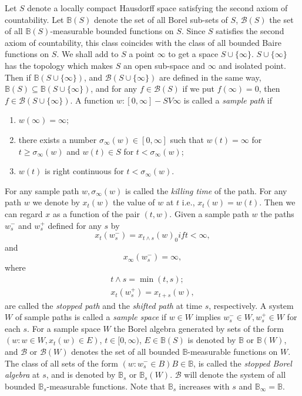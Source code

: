 Let $S$ denote a locally compact Hausdorff space satisfying the second
axiom of countability. Let $\mathbb{B}(S)$ denote the set of all Borel
sub-sets of $S$, $\mathscr{B}(S)$ the set of all
$\mathbb{B}(S)$-measurable bounded functions on $S$. Since $S$
satisfies the second axiom of countability, this class coincides
with the class of all bounded Baire functions on $S$. We shall add to
$S$ a point $\infty$ to get a space $S \cup \{\infty\}$. $S \cup
\{\infty\}$ has the topology which makes $S$ an open sub-space and
$\infty$ and isolated point. Then if $\mathbb{B} (S \cup \{
\infty\})$, and $\mathscr{B}(S\cup\{\infty\})$ are defined in the same
way, $\mathbb{B}(S)\subseteq \mathbb{B}(S\cup \{\infty\})$,
and for any $f \in \mathscr{B}(S)$ if we put $f (\infty) =
0$, then $f \in \mathscr{B}(S \cup \{\infty\}) $. A function $w : [0,
\infty] - SV \infty$ is called a \textit{sample path} if  
\begin{enumerate}
\renewcommand{\labelenumi}{(\theenumi)}
\item $w (\infty) = \infty$; 

\item there exists a number $\sigma_\infty (w)\in [ 0, \infty]$ such that
  $w(t) = \infty$ for $t \geq \sigma_\infty (w)$ and $w (t) \in S $
  for $t < \sigma_\infty (w)$; 
 
\item $w(t)$ is right continuous for $t < \sigma_{\infty} (w)$. 
\end{enumerate}

For any sample path $w, \sigma_\infty (w)$ is called the
\textit{killing time}  of the path. For any path $w$ we denote by $x_t (w)$ the
value of $w$ at $t$ i.e., $x_t (w) = w(t) $. Then we can regard $x$ as
a function of the pair $(t, w)$. Given a sample path $w$ the paths
$w^- _s$ and $w^+ _s$ defined for any $s$ by  
$$
x_t (w^-_s) = x_{t \wedge s} (w)_0 if t <
  \infty,
$$
and\pageoriginale
$$
x_\infty (w^-_{s}) = \infty,
$$
where
\begin{gather*} 
 t \wedge s = \min (t, s);\\
x_t (w^+_s) = x_{ t + s}(w),
\end{gather*}
are called the \textit{stopped path} and the \textit{shifted path} at
time $s$, respectively. A system $W$ of sample paths is called a
\textit{sample space}  if $w \in W$ implies $w^-_s \in W, w^+_s \in
W$ for each $s$. For a sample space $W$ the Borel algebra generated by
sets of the form $(w: w \in W, x_t (w) \in E)$, $t \in [ 0 , \infty)$,
$E \in \mathbb{B}(S)$ is denoted by $\mathbb{B}$ or $\mathbb{B} (W)$,
and $\mathscr{B}$ or $\mathscr{B}(W)$ denotes the set of all bounded
$\mathbb{B}$-measurable functions on $W$. The class of all sets of
the form $(w: w^-_s \in B) B \in \mathbb{B}$, is called the 
\textit{stopped Borel algebra} at $s$, and is denoted by $\mathbb{B}_s$ or
$\mathbb{B}_s(W)$. $\mathscr{B}$ will denote the system of all bounded
$\mathbb{B}_s$-measurable functions. Note that $\mathbb{B}_s$
increases with $s$ and $\mathbb{B}_ \infty = \mathbb{B}$. 

